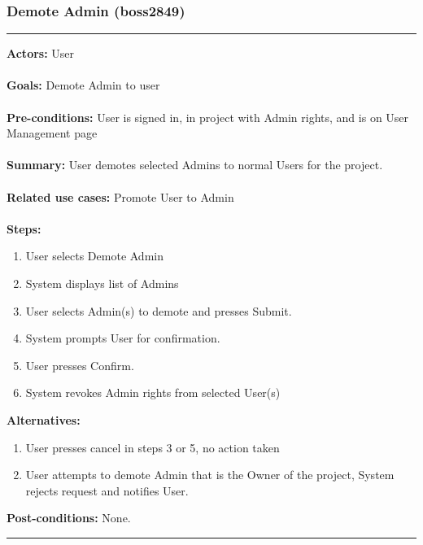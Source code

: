 \documentclass[11pt]{report}
\begin{document}
\subsubsection{Demote Admin  (boss2849)}
\vspace{2pt}
\hrule
\vspace{8pt}
 \textbf{Actors:} User \\ \\
\textbf{Goals:} Demote Admin to user \\ \\
 \textbf{Pre-conditions:} User is signed in, in project with Admin rights, and is on User Management page \\ \\
 \textbf{Summary:} User demotes selected Admins to normal Users for the project. \\ \\
\textbf{Related use cases:} Promote User to Admin \\ \\
\textbf{Steps:} \begin{enumerate}
  \item User selects Demote Admin
  \item System displays list of Admins
  \item User selects Admin(s) to demote and presses Submit.
  \item System prompts User for confirmation.
  \item User presses Confirm.
  \item System revokes Admin rights from selected User(s)
 \end{enumerate}
 \textbf{Alternatives:} \begin{enumerate}
  \item User presses cancel in steps 3 or 5, no action taken
  \item User attempts to demote Admin that is the Owner of the project, System rejects request and notifies User.
 \end{enumerate}
 \textbf{Post-conditions:} None. \\
\vspace{8pt}
\hrule
\newpage
\end{document}
